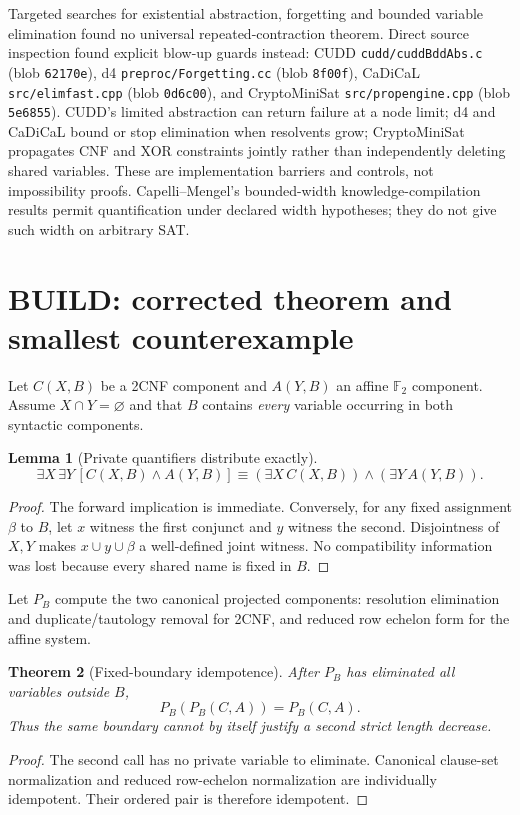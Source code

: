 \documentclass[11pt]{article}
\newtheorem{theorem}{Theorem}
\newtheorem{lemma}[theorem]{Lemma}
\begin{document}
Targeted searches for existential abstraction, forgetting and bounded variable elimination found no universal repeated-contraction theorem.  Direct source inspection found explicit blow-up guards instead: CUDD \texttt{cudd/cuddBddAbs.c} (blob \texttt{62170e}), d4 \texttt{preproc/Forgetting.cc} (blob \texttt{8f00f}), CaDiCaL \texttt{src/elimfast.cpp} (blob \texttt{0d6c00}), and CryptoMiniSat \texttt{src/propengine.cpp} (blob \texttt{5e6855}).  CUDD's limited abstraction can return failure at a node limit; d4 and CaDiCaL bound or stop elimination when resolvents grow; CryptoMiniSat propagates CNF and XOR constraints jointly rather than independently deleting shared variables.  These are implementation barriers and controls, not impossibility proofs.  Capelli--Mengel's bounded-width knowledge-compilation results permit quantification under declared width hypotheses; they do not give such width on arbitrary SAT.

\section{BUILD: corrected theorem and smallest counterexample}
Let $C(X,B)$ be a 2CNF component and $A(Y,B)$ an affine $\mathbb F_2$ component.  Assume $X\cap Y=\varnothing$ and that $B$ contains \emph{every} variable occurring in both syntactic components.

\begin{lemma}[Private quantifiers distribute exactly]
\[
 \exists X\,\exists Y\,[C(X,B)\wedge A(Y,B)]
 \equiv (\exists X\,C(X,B))\wedge(\exists Y\,A(Y,B)).
\]
\end{lemma}
\begin{proof}
The forward implication is immediate.  Conversely, for any fixed assignment $\beta$ to $B$, let $x$ witness the first conjunct and $y$ witness the second.  Disjointness of $X,Y$ makes $x\cup y\cup\beta$ a well-defined joint witness.  No compatibility information was lost because every shared name is fixed in $B$.
\end{proof}

Let $P_B$ compute the two canonical projected components: resolution elimination and duplicate/tautology removal for 2CNF, and reduced row echelon form for the affine system.

\begin{theorem}[Fixed-boundary idempotence]
After $P_B$ has eliminated all variables outside $B$,
\[
   P_B(P_B(C,A))=P_B(C,A).
\]
Thus the same boundary cannot by itself justify a second strict length decrease.
\end{theorem}
\begin{proof}
The second call has no private variable to eliminate.  Canonical clause-set normalization and reduced row-echelon normalization are individually idempotent.  Their ordered pair is therefore idempotent.
\end{proof}
\end{document}
